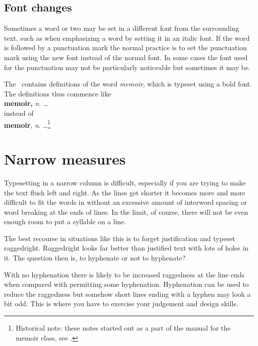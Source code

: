 \documentclass[10pt,a4paper,oneside,extrafontsizes]{memoir}%
\begin{document}
\subsection{Font changes}

\begin{paracol}{2}
\switchEng
    Sometimes a word or two may be set in a different font from the 
surrounding text, such as when emphasizing 
a word by setting it in an
italic font. If the word is followed by a punctuation mark the normal
practice is to set the punctuation mark using the new font instead of 
the normal
font. In some cases the font used for the punctuation may not be
particularly noticeable but sometimes it may be. 

    The \pixfrontmatter\ contains definitions of the word \textit{memoir,}
which is typeset using a bold font. The definitions thus commence like \\
\hspace*{2em} \textbf{memoir,} \textit{n.} \ldots \\
instead of \\
\hspace*{2em} \textbf{memoir}, \textit{n}. \ldots\footnote{Historical
  note: these notes started out as a part of the manual for the memoir
class, see \cite{MEMMAN}.} 
\end{paracol}

\section{Narrow measures}

\begin{paracol}{2}
\switchEng
    Typesetting in a narrow column is difficult, especially if you are
trying to make the text flush left and right. As the lines get shorter
it becomes more and more difficult to fit the words in without an excessive
amount of interword spacing or word breaking at the ends of lines. 
In the limit, of course, there
will not be even enough room to put a syllable on a line.

    The best recourse in situations like this is to forget justification
and typeset raggedright. 
Raggedright looks far better than justified
text with lots of holes in it.
The question then is, to hyphenate or not to hyphenate?

    With no hyphenation there is likely to be increased raggedness at
the line ends when compared with permitting some hyphenation. Hyphenation
can be used to reduce the raggedness but somehow short lines ending with
a hyphen may look a bit odd. This is where you have to exercise your
judgement and design skills.
\end{paracol}
\end{document}

